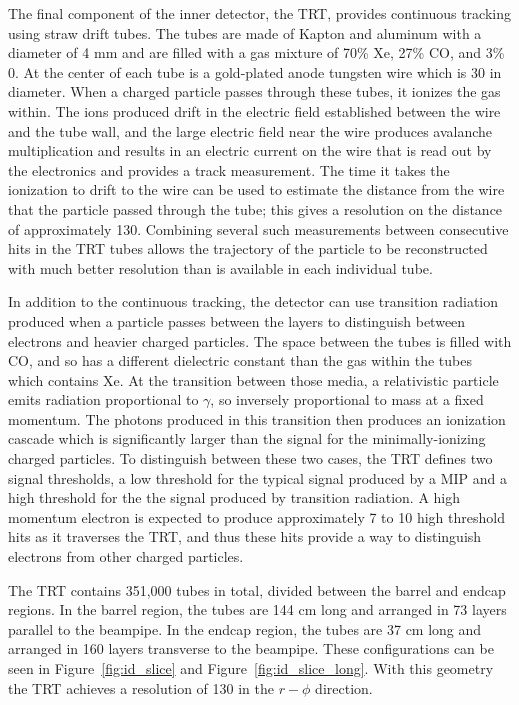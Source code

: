The final component of the inner detector, the \ac{TRT}, provides continuous tracking using straw drift tubes.
The tubes are made of Kapton and aluminum with a diameter of 4 mm and are filled with a gas mixture of 70\% Xe, 27\% CO, and 3\% 0. 
At the center of each tube is a gold-plated anode tungsten wire which is 30 \um in diameter.
When a charged particle passes through these tubes, it ionizes the gas within.
The ions produced drift in the electric field established between the wire and the tube wall, and the large electric field near the wire produces avalanche multiplication and results in an electric current on the wire that is read out by the electronics and provides a track measurement.
The time it takes the ionization to drift to the wire can be used to estimate the distance from the wire that the particle passed through the tube; this gives a resolution on the distance of approximately 130\um.
Combining several such measurements between consecutive hits in the \ac{TRT} tubes allows the trajectory of the particle to be reconstructed with much better resolution than is available in each individual tube.

In addition to the continuous tracking, the detector can use transition radiation produced when a particle passes between the layers to distinguish between electrons and heavier charged particles.
The space between the tubes is filled with CO, and so has a different dielectric constant than the gas within the tubes which contains Xe.
At the transition between those media, a relativistic particle emits radiation proportional to $\gamma$, so inversely proportional to mass at a fixed momentum.
The photons produced in this transition then produces an ionization cascade which is significantly larger than the signal for the minimally-ionizing charged particles.
To distinguish between these two cases, the \ac{TRT} defines two signal thresholds, a low threshold for the typical signal produced by a \ac{MIP} and a high threshold for the the signal produced by transition radiation.
A high momentum electron is expected to produce approximately 7 to 10 high threshold hits as it traverses the \ac{TRT}, and thus these hits provide a way to distinguish electrons from other charged particles. 

The \ac{TRT} contains 351,000 tubes in total, divided between the barrel and endcap regions. 
In the barrel region, the tubes are 144 cm long and arranged in 73 layers parallel to the beampipe.
In the endcap region, the tubes are 37 cm long and arranged in 160 layers transverse to the beampipe.
These configurations can be seen in Figure~\ref{fig:id_slice} and Figure~\ref{fig:id_slice_long}. 
With this geometry the \ac{TRT} achieves a resolution of 130 \um  in the $r-\phi$ direction.


